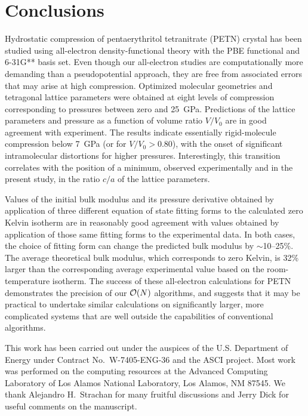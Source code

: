 \documentclass[prb,aps,nobibnotes,twocolumn,doublespace,twocolumngrid,superbib]{revtex4}
\begin{document}
\section{Conclusions}
\label{sec:conclusions}
Hydrostatic compression of pentaerythritol tetranitrate (PETN) crystal
has been studied using all-electron density-functional theory with the
PBE functional and 6-31G** basis set. Even though our all-electron
studies are computationally more demanding than a pseudopotential
approach, they are free from associated errors that may arise 
at high compression.  Optimized molecular
geometries and tetragonal lattice parameters were obtained at eight
levels of compression corresponding to pressures between zero and
25~GPa.  Predictions of the lattice parameters and pressure as a
function of volume ratio $V/V_0$ are in good agreement with
experiment. The results indicate essentially rigid-molecule
compression below 7~GPa (or for $V/V_0 > 0.80$), with the onset of
significant intramolecular distortions for higher pressures.  
Interestingly, this transition correlates with the position of a
minimum, observed experimentally and in the present study, in the 
ratio $c/a$ of the lattice parameters.

Values of the initial bulk modulus and its pressure derivative
obtained by application of three different equation of state fitting
forms to the calculated zero Kelvin isotherm are in reasonably good
agreement with values obtained by application of those same fitting
forms to the experimental data.  In both cases, the choice of fitting
form can change the predicted bulk modulus by $\sim$10--25\%.  The
average theoretical bulk modulus, which corresponds to zero Kelvin,
is 32\% larger than the corresponding average experimental value based
on the room-temperature isotherm.  The success of these all-electron
calculations for PETN demonstrates the precision of our ${\cal O}(N)$ 
algorithms, and suggests that it may be practical to undertake 
similar calculations on significantly larger, more complicated systems 
that are well outside the capabilities of conventional algorithms. 

\begin{acknowledgments}
This work has been carried out under the auspices of the
U.S. Department of Energy under Contract No.~W-7405-ENG-36 and the
ASCI project.  Most work was performed on the computing resources at
the Advanced Computing Laboratory of Los Alamos National Laboratory,
Los Alamos, NM 87545.  We thank Alejandro H.~Strachan for many
fruitful discussions and Jerry Dick for useful comments on the 
manuscript.
\end{acknowledgments}
\end{document}
